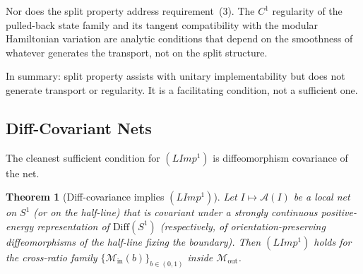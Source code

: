 \documentclass[12pt]{article}
\newtheorem{theorem}{Theorem}[section]
\theoremstyle{definition}
\theoremstyle{remark}
\begin{document}
Nor does the split property address requirement~(3). The $C^1$ regularity of the pulled-back state family and its tangent compatibility with the modular Hamiltonian variation are analytic conditions that depend on the smoothness of whatever generates the transport, not on the split structure.

In summary: split property assists with unitary implementability but does not generate transport or regularity. It is a facilitating condition, not a sufficient one.

\subsection{Diff-Covariant Nets}\label{diff-covariant-nets}

The cleanest sufficient condition for $(LImp^1)$ is diffeomorphism covariance of the net.

\begin{theorem}[Diff-covariance implies $(LImp^1)$]\label{thm:diff-limp}
Let $I \mapsto \mathcal{A}(I)$ be a local net on $S^1$ (or on the half-line) that is covariant under a strongly continuous positive-energy representation of $\mathrm{Diff}(S^1)$ (respectively, of orientation-preserving diffeomorphisms of the half-line fixing the boundary). Then $(LImp^1)$ holds for the cross-ratio family $\{\mathcal{M}_{\mathrm{in}}(b)\}_{b \in (0,1)}$ inside $\mathcal{M}_{\mathrm{out}}$.
\end{theorem}
\end{document}
